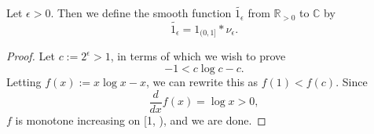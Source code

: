 \begin{definition}[Smooth1]
\label{Smooth1}
\leanok
Let $\epsilon>0$. Then we define the smooth function $\widetilde{1_{\epsilon}}$ from
  $\mathbb{R}_{>0}$ to $\mathbb{C}$ by
  $$\widetilde{1_{\epsilon}} = 1_{(0,1]}\ast\nu_\epsilon.$$
\end{definition}
\begin{proof}
\leanok
Let $c:=2^\epsilon > 1$, in terms of which we wish to prove
  $$
    -1 < c \log c - c .
  $$
  Letting $f(x):=x\log x - x$, we can rewrite this as $f(1) < f(c)$.
  Since
  $$
    \frac {d}{dx}f(x) = \log x > 0 ,
  $$
  $f$ is monotone increasing on [1, \infty), and we are done.
\end{proof}
